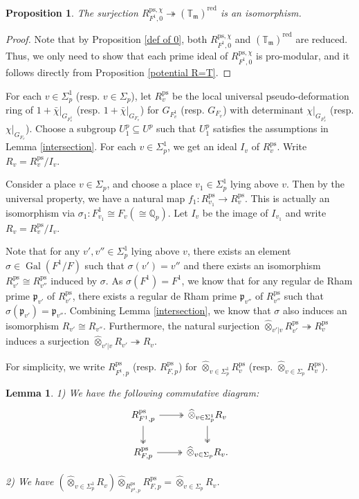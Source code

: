 \documentclass[a4paper, 12pt]{amsart}
\newtheorem{lem}[thm]{Lemma}
\newtheorem{prop}[thm]{Proposition}
\DeclareMathOperator{\Gal}{Gal}
\def\ps{\mathrm{ps}}
\newcommand{\Q}{\mathbb{Q}}
\newcommand{\T}{\mathbb{T}}
\newcommand{\kp}{\mathfrak{p}}
\newcommand{\km}{\mathfrak{m}}
\begin{document}
    \begin{prop}\label{R=T}
    	The surjection $R_{F^1,0}^{\ps, \chi} \twoheadrightarrow (\T_\km)^{\operatorname{red}}$ is an isomorphism.
    \end{prop}
    
   \begin{proof}
   	Note that by Proposition \ref{def of 0}, both $R_{F^1,0}^{\ps, \chi} $ and $(\T_\km)^{\operatorname{red}}$ are reduced. Thus, we only need to show that each prime ideal of $R_{F^1,0}^{\ps, \chi}$ is pro-modular, and it follows directly from Proposition \ref{potential R=T}.
   \end{proof}
    
    For each $v \in \Sigma_p^1$ (resp. $v \in  \Sigma_p$), let $R_v^\ps$ be the local universal pseudo-deformation ring of $1+\bar{\chi}|_{G_{F^1_v}}$ (resp. $1+\bar{\chi}|_{G_{F_v}}$)  for $ {G_{F^1_v}}$ (resp. $ {G_{F_v}}$) with determinant $\chi|_{G_{F^1_v}}$ (resp. $\chi|_{G_{F_v}}$). Choose a subgroup $U^p_1 \subseteq U^p$ such that  $U^p_1$ satisfies the assumptions in Lemma \ref{intersection}. For each $v \in \Sigma_p^1$, we get an ideal $I_v$ of $R_v^\ps$. Write $R_v = R_v^\ps/I_v $.  
    
    Consider a place $v \in \Sigma_p$, and choose a place $v_1 \in \Sigma_p^1$ lying above $v$. Then by the universal property, we have a natural map $f_1: R_{v_1}^\ps \to R_v^\ps$. This is actually an isomorphism via $\sigma_1: F_{v_1}^1 \cong F_v (\cong \Q_p)$. Let $I_v$ be the image of $I_{v_1}$ and write $R_v = R_v^\ps/I_v $.  
    
    Note that for any $v', v'' \in \Sigma_p^1$ lying above $v$, there exists an element $\sigma \in \Gal(F^1/F)$ such that $\sigma(v')=v''$ and there exists an isomorphism $ R_{v'}^\ps \cong R_{v''}^\ps$ induced by $\sigma$. As $\sigma(F^1) = F^1$, we know that for any regular de Rham prime $\kp_{v'}$ of $R_{v'}^\ps$, there exists a regular de Rham prime $\kp_{v''}$ of $R_{v''}^\ps$ such that $\sigma(\kp_{v'})=\kp_{v''}$. Combining Lemma \ref{intersection}, we know that $\sigma$ also induces an isomorphism $R_{v'} \cong R_{v''}$. Furthermore, the natural surjection $\widehat{\otimes}_{v'| v} R_{v'}^\ps \twoheadrightarrow R_{v}^\ps$ induces a surjection $ \widehat{\otimes}_{v'| v} R_{v'} \twoheadrightarrow R_v$.
    
    For simplicity, we write $R_{F^1,p}^\ps$ (resp. $R_{F,p}^\ps$) for $ \widehat{\otimes}_{v \in \Sigma^1_p} R_{v}^\ps$ (resp. $\widehat{\otimes}_{v \in \Sigma_p} R_{v}^\ps$).
    \begin{lem}\label{com dia1} 
    	1) We have the following commutative diagram:
    	\[\begin{tikzcd}
    		R_{F^1,p}^\ps  \arrow[r, two heads] \arrow[d, two heads]& \widehat{\otimes}_{v \in \Sigma^1_p} R_{v} \arrow[d, two heads]\\
    		R_{F,p}^\ps \arrow[r, two heads] & \widehat{\otimes}_{v \in \Sigma_p} R_{v}.
    	\end{tikzcd}\]
    	
    	2) We have $(\widehat{\otimes}_{v \in \Sigma^1_p} R_{v})\widehat{\otimes}_{R_{F^1,p}^\ps} R_{F,p}^\ps = \widehat{\otimes}_{v \in \Sigma_p} R_{v}$.
    \end{lem}
    
\end{document}
